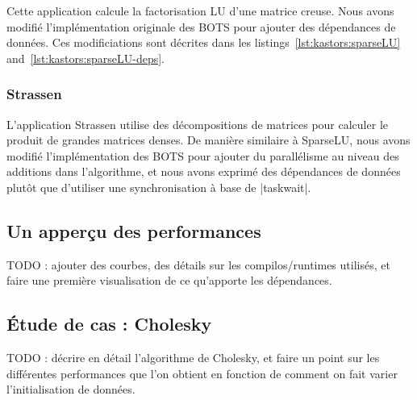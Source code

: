 Cette application calcule la factorisation LU d'une matrice creuse.
Nous avons modifié l'implémentation originale des BOTS pour ajouter des dépendances de données.
Ces modificiations sont décrites dans les listings~\ref{lst:kastors:sparseLU} and~\ref{lst:kastors:sparseLU-deps}.

\subsubsection{Strassen}

L'application Strassen utilise des décompositions de matrices pour calculer le produit de grandes matrices denses.
De manière similaire à SparseLU, nous avons modifié l'implémentation des BOTS pour ajouter du parallélisme au niveau des additions dans l'algorithme, et nous avons exprimé des dépendances de données plutôt que d'utiliser une synchronisation à base de |taskwait|.


\subsection{Un apperçu des performances}

TODO : ajouter des courbes, des détails sur les compilos/runtimes utilisés, et faire une première visualisation de ce qu'apporte les dépendances.

\subsection{Étude de cas : Cholesky}
\label{chap:contribs:apps:kastors:cholesky}

TODO : décrire en détail l'algorithme de Cholesky, et faire un point sur les différentes performances que l'on obtient en fonction de comment on fait varier l'initialisation de données.


